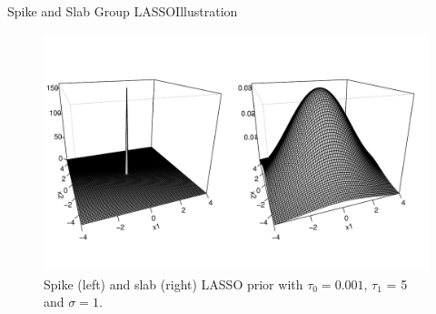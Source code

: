 \documentclass[aspectratio=169]{beamer}					%
\begin{document}

\begin{frame}{Spike and Slab Group LASSO}{Illustration}

\begin{figure}[h]
	\begin{center}
		\includegraphics[width = 0.65\linewidth]{spike_slab_bi.pdf}
	\end{center}
	\caption{Spike (left) and slab (right) LASSO prior with $\tau_0 = 0.001$, $\tau_1$ = 5 and $\sigma=1$.}
	\label{fig:ssbl}
\end{figure}


\end{frame}
\end{document}
